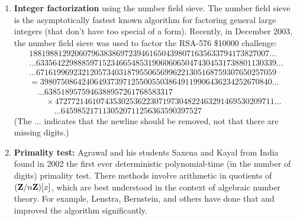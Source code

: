 \begin{enumerate}
\item {\bf Integer factorization} using the number field sieve.  The
number field sieve is the asymptotically fastest known algorithm for
factoring general large integers (that don't have too special of a
form).  Recently, in December 2003, the number field sieve was used to
factor the RSA-576 \$10000 challenge:
$$
\begin{array}{l}
1881988129206079638386972394616504398071635633794173827007\ldots\\
\ldots6335642298885971523466548531906060650474304531738801130339\ldots\\
\ldots6716199692321205734031879550656996221305168759307650257059\\
=39807508642406493739712550055038649119906436234252670840\ldots\\
\hspace{1em}\ldots6385189575946388957261768583317\\
\hspace{2em}\times
47277214610743530253622307197304822463291469530209711\ldots\\
\hspace{3em}\ldots6459852171130520711256363590397527
\end{array}
$$
(The $\ldots$ indicates that the newline should be removed, not that
there are missing digits.)

\item {\bf Primality test:} Agrawal and his students Saxena and Kayal from
India found in 2002 the first ever deterministic
polynomial-time (in the number of digits) primality test.  There
methods involve arithmetic in quotients of $(\mathbf{Z}/n\mathbf{Z})[x]$, which are
best understood in the context of algebraic number theory.  For
example, Lenstra, Bernstein, and others have done that and improved
the algorithm significantly.


\end{enumerate}
